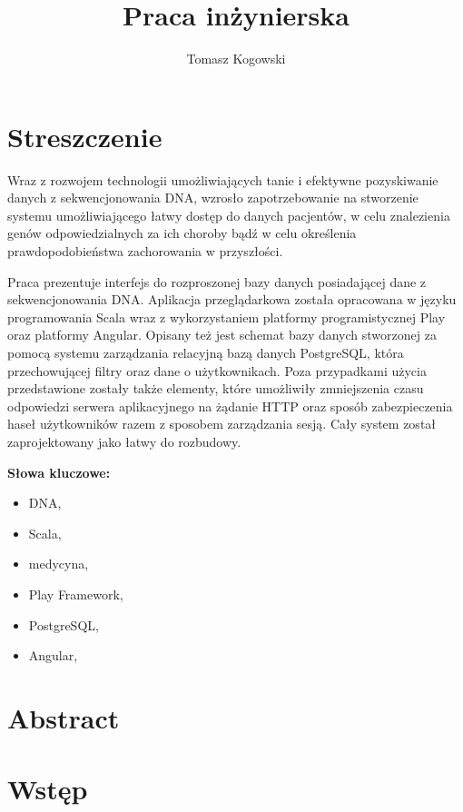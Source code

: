 \documentclass[a4paper,12pt,twoside]{article}
\title{Praca inżynierska}
\author{Tomasz Kogowski}
\begin{document}

\newpage 
\section*{Streszczenie}
Wraz z rozwojem technologii umożliwiających tanie i efektywne
pozyskiwanie danych z sekwencjonowania DNA, wzrosło zapotrzebowanie
na stworzenie systemu umożliwiającego łatwy dostęp do danych pacjentów,
w celu znalezienia genów odpowiedzialnych za ich choroby bądź w celu 
określenia prawdopodobieństwa zachorowania w przyszłości. 

Praca prezentuje interfejs do rozproszonej bazy danych posiadającej 
dane z sekwencjonowania DNA. Aplikacja przeglądarkowa została opracowana
w języku programowania Scala wraz z wykorzystaniem platformy programistycznej
Play oraz platformy Angular. Opisany też jest schemat bazy danych 
stworzonej za pomocą systemu zarządzania relacyjną bazą danych PostgreSQL, która 
przechowującej filtry oraz dane o użytkownikach. 
Poza przypadkami użycia przedstawione zostały także 
elementy, które umożliwiły zmniejszenia czasu odpowiedzi serwera 
aplikacyjnego na żądanie HTTP oraz sposób zabezpieczenia 
haseł użytkowników razem z sposobem zarządzania sesją. 
Cały system został zaprojektowany jako łatwy do rozbudowy.

\textbf{Słowa kluczowe:}
\begin{itemize}
\item DNA,
\item Scala,
\item medycyna,
\item Play Framework,
\item PostgreSQL,
\item Angular,
\end{itemize}
\newpage 
\section*{Abstract}

\newpage

\newpage
\tableofcontents
 
\newpage
\section{Wstęp}  
\end{document}
